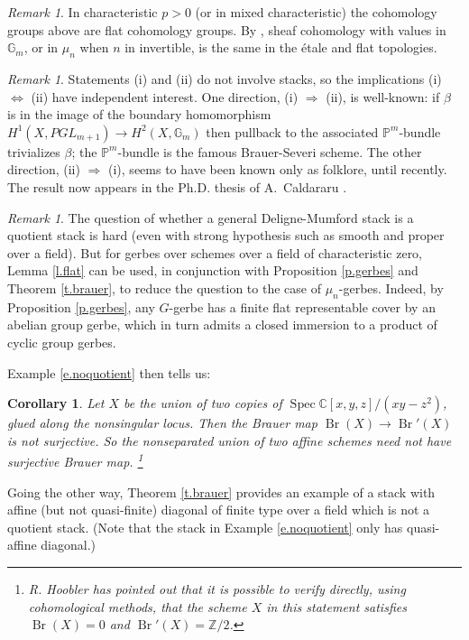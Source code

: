 \documentclass[12pt]{amsart}
\newcommand{\Z}{{\mathbb Z}}
\newcommand{\G}{{\mathbb G}}
\newcommand{\C}{{\mathbb C}}
\newcommand{\bP}{{\mathbb P}}
\DeclareMathOperator{\Spec}{Spec}
\DeclareMathOperator{\Br}{Br}
\theoremstyle{plain}
\newtheorem  {cor}  [thm] {Corollary}
\theoremstyle{definition}
\theoremstyle{remark}
\newtheorem {remark} [thm]  {Remark}
\begin{document}
\begin{remark}
In characteristic $p>0$ (or in mixed characteristic) the cohomology groups
above are flat cohomology groups. By \cite[III.11]{Gr}, sheaf cohomology
with values in $\G_m$, or in $\mu_n$ when $n$ in invertible, is the same in
the \'etale and flat topologies.
\end{remark}

\begin{remark}
Statements (i) and (ii) do not involve stacks, so the implications
(i) $\Leftrightarrow$ (ii) have independent interest.
One direction, (i) $\Rightarrow$ (ii), is well-known: if $\beta$ is in
the image of the boundary homomorphism $H^1(X,PGL_{m+1})\to H^2(X,\G_m)$
then pullback to the associated $\bP^m$-bundle trivializes $\beta$;
the $\bP^m$-bundle is the famous Brauer-Severi scheme.
The other direction, (ii) $\Rightarrow$ (i), seems to have been
known only as folklore, until recently.
The result now appears in the Ph.D. thesis of A.~Caldararu
\cite[Prop.\ 3.3.4]{Ca}.
\end{remark}

\begin{remark}
The question of whether a general Deligne-Mumford stack is
a quotient stack is hard
(even with strong hypothesis such as smooth and proper over a field).
But for gerbes over schemes over a field of characteristic zero,
Lemma \ref{l.flat} can be used, in conjunction with
Proposition \ref{p.gerbes} and Theorem \ref{t.brauer}, to
reduce the question to the case of 
$\mu_n$-gerbes.
Indeed, by Proposition \ref{p.gerbes}, any $G$-gerbe has a finite flat
representable cover
by an abelian group gerbe, which in turn admits a closed immersion to
a product of cyclic group gerbes.
\end{remark}



Example \ref{e.noquotient} then tells us:

\begin{cor} \label{c.brauernonsurject}
Let $X$ be the union of two copies of
$\Spec \C[x,y,z]/(xy-z^2)$, glued along the nonsingular locus.
Then the Brauer map $\Br(X)\to\Br'(X)$ is not surjective.
So the nonseparated union of two affine schemes need not have
surjective Brauer map.
\footnote{R. Hoobler has pointed out that it is possible to verify directly,
using cohomological methods, that the scheme $X$ in this statement satisfies
$\Br(X)=0$ and $\Br'(X)=\Z/2$.}
\end{cor}

Going the other way, Theorem \ref{t.brauer} provides an example of a
stack with affine (but not quasi-finite) 
diagonal of finite type over a field
which is not a quotient stack.
(Note that 
the stack in Example \ref{e.noquotient} only has quasi-affine diagonal.)
\end{document}
